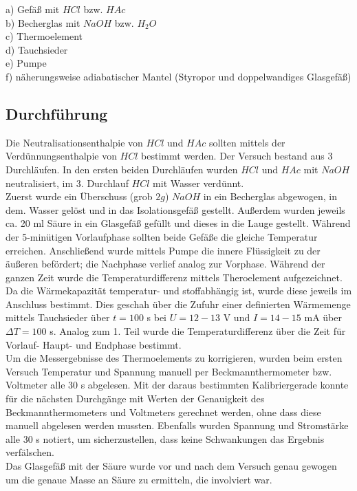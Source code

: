 \documentclass[12pt,a4paper,titlepage,headinclude,bibtotoc]{scrartcl}
\begin{document}
a) Gefäß mit $HCl$ bzw. $HAc$\\
b) Becherglas mit $NaOH$ bzw. $H_2O$\\
c) Thermoelement\\
d) Tauchsieder\\
e) Pumpe \\
f) näherungsweise adiabatischer Mantel (Styropor und doppelwandiges Glasgefäß)\\


\subsection{Durchführung}
Die Neutralisationsenthalpie von $HCl$ und $HAc$ sollten mittels der Verdünnungsenthalpie von $HCl$ bestimmt werden. Der Versuch bestand aus 3 Durchläufen. In den ersten beiden Durchläufen wurden $HCl$ und $HAc$ mit $NaOH$ neutralisiert, im 3. Durchlauf $HCl$ mit Wasser verdünnt.\\
Zuerst wurde ein Überschuss (grob $2g$) $NaOH$ in ein Becherglas abgewogen, in dem. Wasser gelöst und in das Isolationsgefäß gestellt. Außerdem wurden jeweils ca. 20 ml Säure in ein Glasgefäß gefüllt und dieses in die Lauge gestellt.
Während der 5-minütigen Vorlaufphase sollten beide Gefäße die gleiche Temperatur erreichen. Anschließend wurde mittels Pumpe die innere Flüssigkeit zu der äußeren befördert; die Nachphase verlief analog zur Vorphase. Während der ganzen Zeit wurde die Temperaturdifferenz mittels Theroelement aufgezeichnet. \\
Da die Wärmekapazität temperatur- und stoffabhängig ist, wurde diese jeweils im Anschluss bestimmt. Dies geschah über die Zufuhr einer definierten Wärmemenge mittels Tauchsieder über $t=100$ s bei $U= 12-13$ V und $I=14-15$ mA über $\Delta T=100$ s. Analog zum 1. Teil wurde die Temperaturdifferenz über die Zeit für Vorlauf- Haupt- und Endphase bestimmt. \\
Um die Messergebnisse des Thermoelements zu korrigieren, wurden beim ersten Versuch Temperatur und Spannung manuell per Beckmannthermometer bzw. Voltmeter alle 30 s abgelesen. Mit der daraus bestimmten Kalibriergerade konnte für die nächsten Durchgänge mit Werten der Genauigkeit des Beckmannthermometers und Voltmeters gerechnet werden, ohne dass diese manuell abgelesen werden mussten.  Ebenfalls wurden Spannung und Stromstärke alle 30 s notiert, um sicherzustellen, dass keine Schwankungen das Ergebnis verfälschen.\\
Das Glasgefäß mit der Säure wurde vor und nach dem Versuch genau gewogen um die genaue Masse an Säure zu ermitteln, die involviert war.\\
\end{document}
